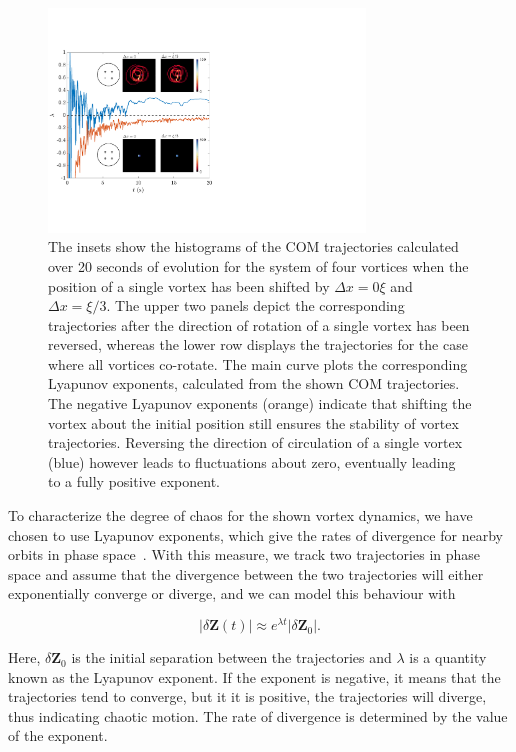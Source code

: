 \begin{figure}
\center \includegraphics[width=0.75\textwidth]{data/2d/lyap/lyap}

\caption{
The insets show the histograms of the COM trajectories calculated over 20 seconds of evolution for the system of four vortices when the position of a single vortex has been shifted by $\Delta x=0\xi$ and $\Delta x=\xi/3$.
The upper two panels depict the corresponding trajectories after the direction of rotation of a single vortex has been reversed, whereas the lower row displays the trajectories for the case where all vortices co-rotate.
The main curve plots the corresponding Lyapunov exponents,  calculated from the shown COM trajectories. 
The negative Lyapunov exponents (orange) indicate that shifting the vortex about the initial position still ensures the stability of vortex trajectories. Reversing the direction of circulation of a single vortex (blue) however leads to fluctuations about zero, eventually leading to a fully positive exponent. 
}
\label{fig:lyap}
\end{figure}


To characterize the degree of chaos for the shown vortex dynamics, we have chosen to use Lyapunov exponents, which give the rates of divergence for nearby orbits in phase space~\cite{wolf1985}.
With this measure, we track two trajectories in phase space and assume that the divergence between the two trajectories will either exponentially converge or diverge, and we can model this behaviour with

\begin{equation}
|\delta\mathbf{Z}(t)| \approx e^{\lambda t} |\delta \mathbf{Z}_0|.
\end{equation}

\noindent Here, $\delta\mathbf{Z}_0$ is the initial separation between the trajectories and $\lambda$ is a quantity known as the Lyapunov exponent.
If the exponent is negative, it means that the trajectories tend to converge, but it it is positive, the trajectories will diverge, thus indicating chaotic motion.
The rate of divergence is determined by the value of the exponent.

